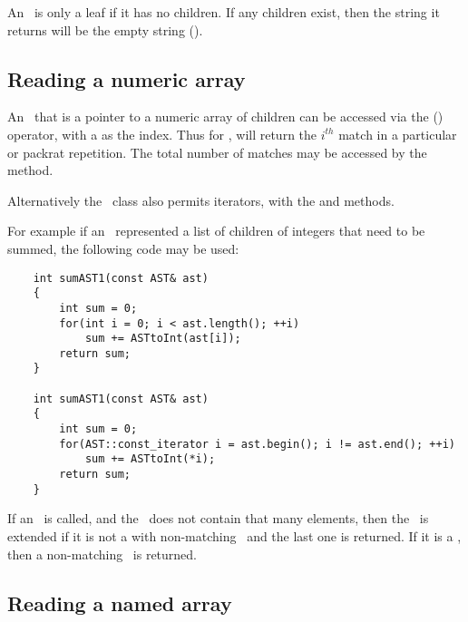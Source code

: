 An \AST\ is only a leaf if it has no children.
    If any children exist, then the string it returns will be the empty string ().

\subsection{Reading a numeric array}
An \AST\ that is a pointer to a numeric array of children can be accessed via the (\code{[]}) operator,
    with a  as the index.
    Thus for ,  will return the $i^{th}$ match in a particular \code{*} or \code{+} packrat repetition.
    The total number of matches may be accessed by the  method.

Alternatively the \AST\ class also permits iterators, with the  and  methods.

For example if an \AST\ represented a list of children of integers that need to be summed,
    the following code may be used:
    \begin{verbatim}
    int sumAST1(const AST& ast)
    {
        int sum = 0;
        for(int i = 0; i < ast.length(); ++i)
            sum += ASTtoInt(ast[i]);
        return sum;
    }
    
    int sumAST1(const AST& ast)
    {
        int sum = 0;
        for(AST::const_iterator i = ast.begin(); i != ast.end(); ++i)
            sum += ASTtoInt(*i);
        return sum;
    }
    \end{verbatim}

If an \AST\ is called, and the \AST\ does not contain that many elements,
    then the \AST\ is extended if it is not a  with non-matching \AST\,
    and the last one is returned.
    If it is a , then a non-matching \AST\ is returned.

\subsection{Reading a named array}
